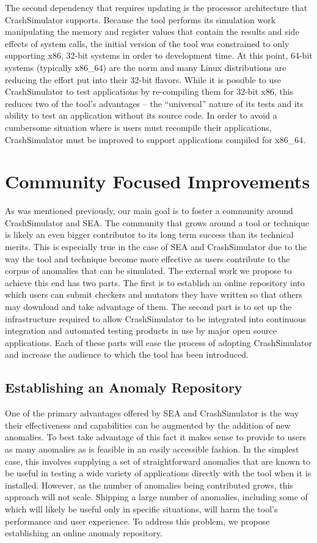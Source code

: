 \documentclass[twocolumn]{article}
\begin{document}
The second dependency that requires updating is the processor architecture
that CrashSimulator supports.  Because the tool performs its simulation
work manipulating the memory and register values that contain the results
and side effects of system calls, the initial version of the tool was
constrained to only supporting x86, 32-bit systems in order to development
time.  At this point, 64-bit systems (typically x86\_64) are the norm and
many Linux distributions are reducing the effort put into their 32-bit
flavors.  While it is possible to use CrashSimulator to test applications
by re-compiling them for 32-bit x86, this reduces two of the tool's
advantages -- the ``universal'' nature of its tests and its ability to test
an application without its source code.  In order to avoid a cumbersome
situation where is users must recompile their applications, CrashSimulator
must be improved to support applications compiled for x86\_64.


\section{Community Focused Improvements}

As was mentioned previously, our main goal is to foster a community around
CrashSimulator and SEA.  The community that grows around a tool or
technique is likely an even bigger contributor to its long term success
than its technical merits.  This is especially true in the case of SEA and
CrashSimulator due to the way the tool and technique become more effective
as users contribute to the corpus of anomalies that can be simulated.  The
external work we propose to achieve this end has two parts.  The first is
to establish an online repository into which users can submit checkers and
mutators they have written so that others may download and take advantage
of them.  The second part is to set up the infrastructure required to allow
CrashSimulator to be integrated into continuous integration and automated
testing products in use by major open source applications.  Each of these
parts will ease the process of adopting CrashSimulator and increase the
audience to which the tool has been introduced.

\subsection{Establishing an Anomaly Repository}

One of the primary advantages offered by SEA and CrashSimulator is the way
their effectiveness and capabilities can be augmented by the addition of
new anomalies.  To best take advantage of this fact it makes sense to
provide to users as many anomalies as is feasible in an easily accessible
fashion.  In the simplest case, this involves supplying a set of
straightforward anomalies that are known to be useful in testing a wide
variety of applications directly with the tool when it is installed.
However, as the number of anomalies being contributed grows, this approach
will not scale.  Shipping a large number of anomalies, including some of
which will likely be useful only in specific situations, will harm the
tool's performance and user experience.  To address this problem, we
propose establishing an online anomaly repository.
\end{document}

